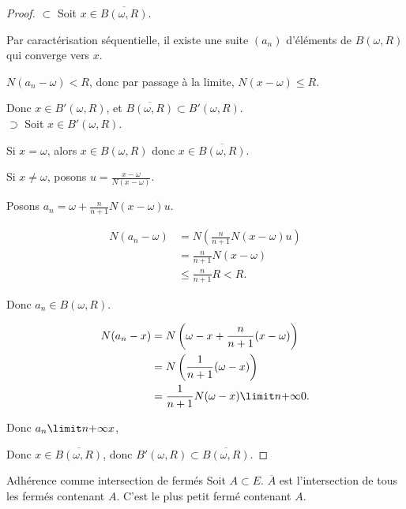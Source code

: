 \begin{proof}
    $\subset$ Soit $x \in \overline{B(\omega, R)}$.

    Par caractérisation séquentielle, il existe une suite $(a_n)$ d'éléments de
    $B(\omega, R)$ qui converge vers $x$.

    $N(a_n - \omega) < R$, donc par passage à la limite, $N(x - \omega) \leqslant R$. 

    Donc $x \in B'(\omega, R)$, et $\overline{B(\omega, R)} \subset B'(\omega, R)$. \\

    $\supset$ Soit $x \in B'(\omega, R)$.

    Si $x = \omega$, alors $x \in B(\omega, R)$ donc $x \in \overline{B(\omega, R)}$.

    Si $x \neq \omega$, posons $u = \frac{x - \omega }{N(x - \omega)}$.

    Posons $a_n = \omega + \frac n {n + 1} N(x - \omega)u$. 

    \begin{align*}
        N(a_n - \omega) & = N\left( \frac n {n + 1} N(x - \omega) u \right) \\
        & = \frac n {n + 1} N(x - \omega) \\
        & \leqslant \frac n {n + 1} R < R.  
    \end{align*}

    Donc $a_n \in B(\omega, R)$.

    \begin{align*}
        N(a_n - x) & = N\left( \omega - x + \frac n {n + 1} (x - \omega) \right) \\
        & = N\left( \frac 1 {n + 1}(\omega - x) \right) \\
        & = \frac 1 {n + 1} N(\omega - x) \limit n {+ \infty} 0.
    \end{align*}

    Donc $a_n \limit n {+ \infty} x$, 

    Donc $x \in \overline{B(\omega, R)}$, donc $B'(\omega, R) \subset \overline{B(\omega, R)}$.
\end{proof}

\begin{theoreme}{Adhérence comme intersection de fermés}{}
    Soit $A \subset E$.
    $\overline A$ est l'intersection de tous les fermés contenant $A$.
    C'est le plus petit fermé contenant $A$.
\end{theoreme}


